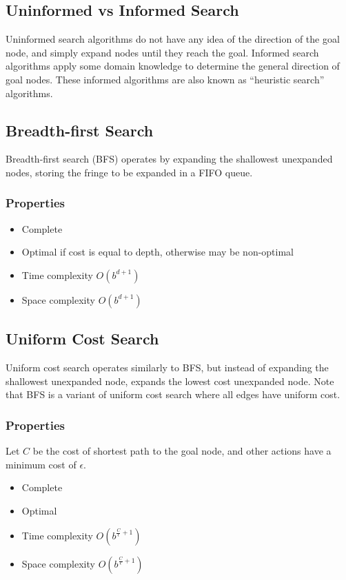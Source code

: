 \documentclass[12pt,titlepage]{article}
\begin{document}
    \subsection{Uninformed vs Informed Search}
      Uninformed search algorithms do not have any idea of the direction of the goal node, and simply expand nodes until they
      reach the goal. Informed search algorithms apply some domain knowledge to determine the general direction of goal nodes.
      These informed algorithms are also known as ``heuristic search'' algorithms.

    \subsection{Breadth-first Search}
      Breadth-first search (BFS) operates by expanding the shallowest unexpanded nodes, storing the fringe to be expanded in a FIFO
      queue.

      \subsubsection{Properties}
        \begin{itemize}
          \item Complete
          \item Optimal if cost is equal to depth, otherwise may be non-optimal
          \item Time complexity $O(b^{d+1})$
          \item Space complexity $O(b^{d+1})$
        \end{itemize}

    \subsection{Uniform Cost Search}
      Uniform cost search operates similarly to BFS, but instead of expanding the shallowest unexpanded node, expands the lowest cost
      unexpanded node. Note that BFS is a variant of uniform cost search where all edges have uniform cost.

      \subsubsection{Properties}
        Let $C$ be the cost of shortest path to the goal node, and other actions have a minimum cost of $\epsilon$.
        \begin{itemize}
          \item Complete
          \item Optimal
          \item Time complexity $O(b^{\frac{C}{\epsilon} + 1})$
          \item Space complexity $O(b^{\frac{C}{\epsilon} + 1})$
        \end{itemize}
\end{document}

